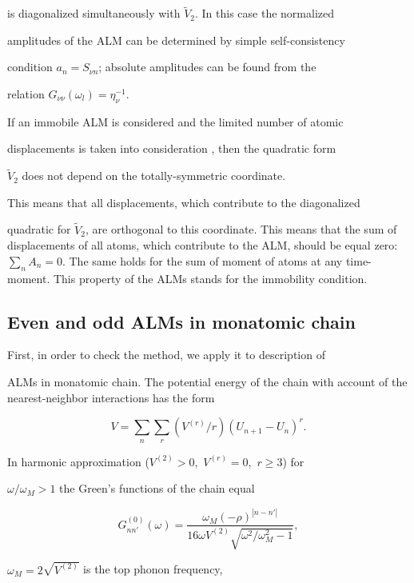 is diagonalized simultaneously with $\tilde{V}_2$. In this case the normalized

amplitudes of the ALM can be determined by simple self-consistency 

condition $a_n =  S_{\nu n}$; absolute amplitudes can be found from the

relation $G_{\nu \nu}(\omega_l) = \eta_{\nu}^{-1}$. 



If an immobile ALM is considered and the limited number of atomic

displacements is taken into consideration
, then the quadratic form

$\tilde{V}_2$ does not depend on the totally-symmetric coordinate. 

This means that all displacements, which contribute to the diagonalized 

quadratic for $\tilde{V}_2$, are orthogonal to this coordinate. 
This means that the sum of displacements of all atoms, which 
contribute to the ALM, should be equal zero: $\sum_n A_n = 0$. 
The same holds for the sum of moment of atoms at any time-moment. 
This property of the ALMs stands for the
 immobility condition.  



\subsection{Even and odd ALMs in monatomic chain} 

First, in order to check the method, we apply it to description of

ALMs in monatomic chain. The potential energy of the chain with account 
of the nearest-neighbor interactions has the 
form

$$ 

V=\sum_n \sum_r (V^{(r)}/r) (U_{n+1} -U_n)^r. 

$$ 



In harmonic approximation ($V^{(2)}>0,\,\, V^{(r)}=0,\,\, r\geq 3$) for 

$\omega/\omega_M > 1$ the Green's functions of the chain equal \cite{economou}

$$

G^{(0)}_{nn'}(\omega) = \frac{\omega_M (-\rho)^{|n-n'|}}

{16 \omega V^{(2)} \sqrt{\omega^2 /\omega_M^2 -1}},

$$ 

$\omega_M = 2\sqrt{V^{(2)}}$ is the top phonon frequency,

